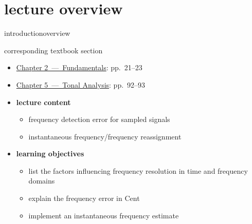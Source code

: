




\subtitle{Module 5.3: Instantaneous Frequency}


	

    \section[overview]{lecture overview}
        \begin{frame}{introduction}{overview}
            \begin{block}{corresponding textbook section}
                \begin{itemize}
                    \item \href{http://ieeexplore.ieee.org/xpl/articleDetails.jsp?tp=&arnumber=6331119&}{Chapter 2~---~Fundamentals}: pp.~21--23
                    \item   \href{http://ieeexplore.ieee.org/xpl/articleDetails.jsp?arnumber=6331122}{Chapter 5~---~Tonal Analysis}: pp.~92--93
                \end{itemize}
            \end{block}

            \begin{itemize}
                \item   \textbf{lecture content}
                    \begin{itemize}
                        \item   frequency detection error for sampled signals
                        \item   instantaneous frequency/frequency reassignment
                    \end{itemize}
                \bigskip
                \item<2->   \textbf{learning objectives}
                    \begin{itemize}
                        \item   list the factors influencing frequency resolution in time and frequency domains
                        \item   explain the frequency error in Cent
                        \item   implement an instantaneous frequency estimate
                    \end{itemize}
            \end{itemize}
        \end{frame}

